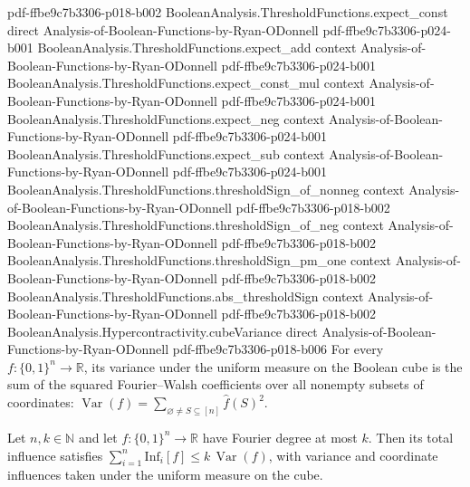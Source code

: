 \begin{lemma}
  {pdf-ffbe9c7b3306-p018-b002}
\proofstep
  {BooleanAnalysis.ThresholdFunctions.expect_const}
  {direct}
  {Analysis-of-Boolean-Functions-by-Ryan-ODonnell}
  {pdf-ffbe9c7b3306-p024-b001}
\proofstep
  {BooleanAnalysis.ThresholdFunctions.expect_add}
  {context}
  {Analysis-of-Boolean-Functions-by-Ryan-ODonnell}
  {pdf-ffbe9c7b3306-p024-b001}
\proofstep
  {BooleanAnalysis.ThresholdFunctions.expect_const_mul}
  {context}
  {Analysis-of-Boolean-Functions-by-Ryan-ODonnell}
  {pdf-ffbe9c7b3306-p024-b001}
\proofstep
  {BooleanAnalysis.ThresholdFunctions.expect_neg}
  {context}
  {Analysis-of-Boolean-Functions-by-Ryan-ODonnell}
  {pdf-ffbe9c7b3306-p024-b001}
\proofstep
  {BooleanAnalysis.ThresholdFunctions.expect_sub}
  {context}
  {Analysis-of-Boolean-Functions-by-Ryan-ODonnell}
  {pdf-ffbe9c7b3306-p024-b001}
\proofstep
  {BooleanAnalysis.ThresholdFunctions.thresholdSign_of_nonneg}
  {context}
  {Analysis-of-Boolean-Functions-by-Ryan-ODonnell}
  {pdf-ffbe9c7b3306-p018-b002}
\proofstep
  {BooleanAnalysis.ThresholdFunctions.thresholdSign_of_neg}
  {context}
  {Analysis-of-Boolean-Functions-by-Ryan-ODonnell}
  {pdf-ffbe9c7b3306-p018-b002}
\proofstep
  {BooleanAnalysis.ThresholdFunctions.thresholdSign_pm_one}
  {context}
  {Analysis-of-Boolean-Functions-by-Ryan-ODonnell}
  {pdf-ffbe9c7b3306-p018-b002}
\proofstep
  {BooleanAnalysis.ThresholdFunctions.abs_thresholdSign}
  {context}
  {Analysis-of-Boolean-Functions-by-Ryan-ODonnell}
  {pdf-ffbe9c7b3306-p018-b002}
\proofstep
  {BooleanAnalysis.Hypercontractivity.cubeVariance}
  {direct}
  {Analysis-of-Boolean-Functions-by-Ryan-ODonnell}
  {pdf-ffbe9c7b3306-p018-b006}
For every $f:\{0,1\}^n\to\mathbb R$, its variance under the uniform measure on the
Boolean cube is the sum of the squared Fourier–Walsh coefficients over all nonempty
subsets of coordinates: $\operatorname{Var}(f)=\sum_{\varnothing\ne
S\subseteq[n]}\widehat f(S)^2$.
\end{lemma}

\begin{lemma}
\leanok
{}
Let $n,k\in\mathbb N$ and let $f:\{0,1\}^n\to\mathbb R$ have Fourier degree at most $k$.
Then its total influence satisfies $\sum_{i=1}^n\mathrm{Inf}_i[f]\le
k\,\operatorname{Var}(f)$, with variance and coordinate influences taken under the
uniform measure on the cube.
\end{lemma}

